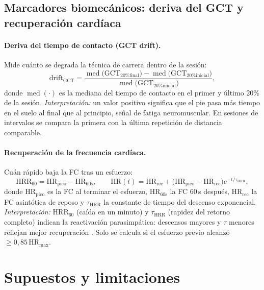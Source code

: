 \documentclass[11pt,a4paper]{article}
\DeclareMathOperator{\med}{med}
\begin{document}
\subsection{Marcadores biomecánicos: deriva del GCT y recuperación cardíaca}
\label{sec:biomech}

\paragraph{Deriva del tiempo de contacto (GCT drift).} Mide cuánto se degrada la técnica de carrera dentro de la sesión:
\begin{equation}
\mathrm{drift}_{\mathrm{GCT}} = \frac{\med\!\big(\mathrm{GCT}_{\text{20\% final}}\big) - \med\!\big(\mathrm{GCT}_{\text{20\% inicial}}\big)}{\med\!\big(\mathrm{GCT}_{\text{20\% inicial}}\big)},
\label{eq:gctdrift}
\end{equation}
donde $\med(\cdot)$ es la mediana del tiempo de contacto en el primer y último 20\% de la sesión. \textit{Interpretación:} un valor positivo significa que el pie pasa más tiempo en el suelo al final que al principio, señal de fatiga neuromuscular. En sesiones de intervalos se compara la primera con la última repetición de distancia comparable.

\paragraph{Recuperación de la frecuencia cardíaca.} Cuán rápido baja la FC tras un esfuerzo:
\begin{equation}
\mathrm{HRR}_{60} = \mathrm{HR}_{\mathrm{pico}} - \mathrm{HR}_{60\mathrm{s}},
\qquad
\mathrm{HR}(t) = \mathrm{HR}_{\mathrm{rec}} + \big(\mathrm{HR}_{\mathrm{pico}} - \mathrm{HR}_{\mathrm{rec}}\big)e^{-t/\tau_{\mathrm{HRR}}},
\label{eq:hrrec}
\end{equation}
donde $\mathrm{HR}_{\mathrm{pico}}$ es la FC al terminar el esfuerzo, $\mathrm{HR}_{60\mathrm{s}}$ la FC 60\,s después, $\mathrm{HR}_{\mathrm{rec}}$ la FC asintótica de reposo y $\tau_{\mathrm{HRR}}$ la constante de tiempo del descenso exponencial. \textit{Interpretación:} $\mathrm{HRR}_{60}$ (caída en un minuto) y $\tau_{\mathrm{HRR}}$ (rapidez del retorno completo) indican la reactivación parasimpática: descensos mayores y $\tau$ menores reflejan mejor recuperación \citep{stanley2013}. Solo se calcula si el esfuerzo previo alcanzó $\ge0{,}85\,\mathrm{HR}_{\max}$.
\newpage

\section{Supuestos y limitaciones}\label{sec:limits}
\end{document}
